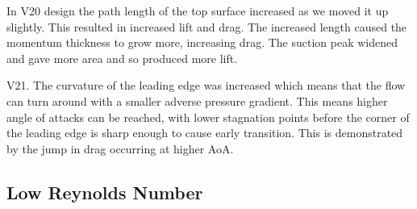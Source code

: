 \documentclass{article}
\begin{document}
In V20 design the path length of the top surface increased as we moved it up slightly.
This resulted in increased lift and drag.
The increased length caused the momentum thickness to grow more, increasing drag.
The suction peak widened and gave more area and so produced more lift.

V21. The curvature of the leading edge was increased which means that the flow can turn around with a smaller adverse pressure gradient.
This means higher angle of attacks can be reached, with lower stagnation points before the corner of the leading edge is sharp enough to cause early transition.
This is demonstrated by the jump in drag occurring at higher AoA.


\subsection{Low Reynolds Number}
\end{document}
